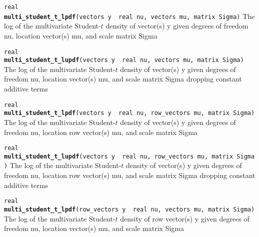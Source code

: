 \documentclass[
  10pt,
]{book}
\begin{document}

\texttt{real} \textbf{\texttt{multi\_student\_t\_lpdf}}\texttt{(vectors\ y\ \textbar{}\ real\ nu,\ vectors\ mu,\ matrix\ Sigma)}\newline
The log of the multivariate Student-\(t\) density of vector(s) y given
degrees of freedom nu, location vector(s) mu, and scale matrix Sigma


\texttt{real} \textbf{\texttt{multi\_student\_t\_lupdf}}\texttt{(vectors\ y\ \textbar{}\ real\ nu,\ vectors\ mu,\ matrix\ Sigma)}\newline
The log of the multivariate Student-\(t\) density of vector(s) y given
degrees of freedom nu, location vector(s) mu, and scale matrix Sigma
dropping constant additive terms


\texttt{real} \textbf{\texttt{multi\_student\_t\_lpdf}}\texttt{(vectors\ y\ \textbar{}\ real\ nu,\ row\_vectors\ mu,\ matrix\ Sigma)}\newline
The log of the multivariate Student-\(t\) density of vector(s) y given
degrees of freedom nu, location row vector(s) mu, and scale matrix
Sigma


\texttt{real} \textbf{\texttt{multi\_student\_t\_lupdf}}\texttt{(vectors\ y\ \textbar{}\ real\ nu,\ row\_vectors\ mu,\ matrix\ Sigma)}\newline
The log of the multivariate Student-\(t\) density of vector(s) y given
degrees of freedom nu, location row vector(s) mu, and scale matrix
Sigma dropping constant additive terms


\texttt{real} \textbf{\texttt{multi\_student\_t\_lpdf}}\texttt{(row\_vectors\ y\ \textbar{}\ real\ nu,\ vectors\ mu,\ matrix\ Sigma)}\newline
The log of the multivariate Student-\(t\) density of row vector(s) y
given degrees of freedom nu, location vector(s) mu, and scale matrix
Sigma
\end{document}
